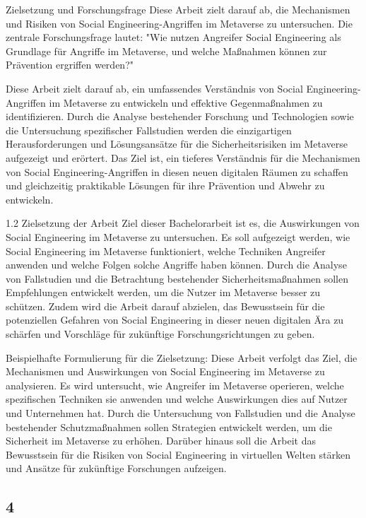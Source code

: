 Zielsetzung und Forschungsfrage
Diese Arbeit zielt darauf ab, die Mechanismen und Risiken von Social Engineering-Angriffen im Metaverse zu untersuchen. Die zentrale Forschungsfrage lautet: "Wie nutzen Angreifer Social Engineering als Grundlage für Angriffe im Metaverse, und welche Maßnahmen können zur Prävention ergriffen werden?"


Diese Arbeit zielt darauf ab, ein umfassendes Verständnis von Social Engineering-Angriffen im Metaverse zu entwickeln und effektive Gegenmaßnahmen zu identifizieren. Durch die Analyse bestehender Forschung und Technologien sowie die Untersuchung spezifischer Fallstudien werden die einzigartigen Herausforderungen und Lösungsansätze für die Sicherheitsrisiken im Metaverse aufgezeigt und erörtert. Das Ziel ist, ein tieferes Verständnis für die Mechanismen von Social Engineering-Angriffen in diesen neuen digitalen Räumen zu schaffen und gleichzeitig praktikable Lösungen für ihre Prävention und Abwehr zu entwickeln.


1.2 Zielsetzung der Arbeit
Ziel dieser Bachelorarbeit ist es, die Auswirkungen von Social Engineering im Metaverse zu untersuchen. Es soll aufgezeigt werden, wie Social Engineering im Metaverse funktioniert, welche Techniken Angreifer anwenden und welche Folgen solche Angriffe haben können. Durch die Analyse von Fallstudien und die Betrachtung bestehender Sicherheitsmaßnahmen sollen Empfehlungen entwickelt werden, um die Nutzer im Metaverse besser zu schützen. Zudem wird die Arbeit darauf abzielen, das Bewusstsein für die potenziellen Gefahren von Social Engineering in dieser neuen digitalen Ära zu schärfen und Vorschläge für zukünftige Forschungsrichtungen zu geben.

Beispielhafte Formulierung für die Zielsetzung:
Diese Arbeit verfolgt das Ziel, die Mechanismen und Auswirkungen von Social Engineering im Metaverse zu analysieren. Es wird untersucht, wie Angreifer im Metaverse operieren, welche spezifischen Techniken sie anwenden und welche Auswirkungen dies auf Nutzer und Unternehmen hat. Durch die Untersuchung von Fallstudien und die Analyse bestehender Schutzmaßnahmen sollen Strategien entwickelt werden, um die Sicherheit im Metaverse zu erhöhen. Darüber hinaus soll die Arbeit das Bewusstsein für die Risiken von Social Engineering in virtuellen Welten stärken und Ansätze für zukünftige Forschungen aufzeigen.



\subsection*{4}




